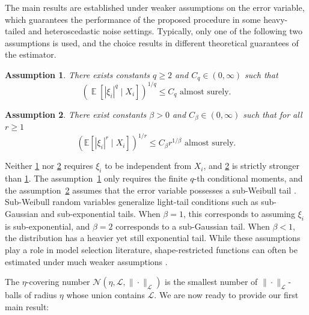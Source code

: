 \documentclass[12pt]{article}
\DeclareMathOperator*{\E}{\mathbb{E}}
\newtheorem{assumption}{Assumption}[section]
\begin{document}
The main results are established under weaker assumptions on the error variable, which guarantees the performance of the proposed procedure in some heavy-tailed and heteroscedastic noise settings. Typically, only one of the following two assumptions is used, and the choice results in different theoretical guarantees of the estimator.
\begin{assumption}\label{as:q-moment}
    There exists constants $q \geq 2$ and $C_q \in (0,\infty)$ such that 
    \begin{equation*}
        \left(\E[|\xi_i|^q\mid X_i]\right)^{1/q}\le C_q \text{ almost surely}.
    \end{equation*}
\end{assumption}
\begin{assumption}\label{as:beta-weibull}
    There exist constants $\beta>0$ and $C_\beta \in(0, \infty)$ such that for all $r \geq 1$
    \begin{equation*}
\left(\mathbb{E}\left[|\xi_i|^r\mid X_i\right]\right)^{1 / r} \leq C_\beta r^{1 / \beta}\text{ almost surely}.
\end{equation*}
\end{assumption}
Neither \ref{as:q-moment} nor \ref{as:beta-weibull} requires $\xi_i$ to be independent from $X_i$, and \ref{as:beta-weibull} is strictly stronger than \ref{as:q-moment}. The assumption~\ref{as:q-moment} only requires the finite $q$-th conditional moments, and the assumption~\ref{as:beta-weibull} assumes that the error variable possesses a sub-Weibull tail \citep{kuchibhotla2022moving}. Sub-Weibull random variables generalize light-tail conditions such as sub-Gaussian and sub-exponential tails. When $\beta=1$, this corresponds to assuming $\xi_i$ is sub-exponential, and $\beta=2$ corresponds to a sub-Gaussian tail. When $\beta<1$, the distribution has a heavier yet still exponential tail. While these assumptions play a role in model selection literature, shape-restricted functions can often be estimated under much weaker assumptions \citep{zhang2002risk}.


The $\eta$-covering number $\mathcal{N}(\eta, \mathcal{L}, \|\cdot\|_{\mathcal{L}})$ is the smallest number of $\|\cdot\|_{\mathcal{L}}$-balls of radius $\eta$ whose union contains $\mathcal{L}$. We are now ready to provide our first main result:
\end{document}
